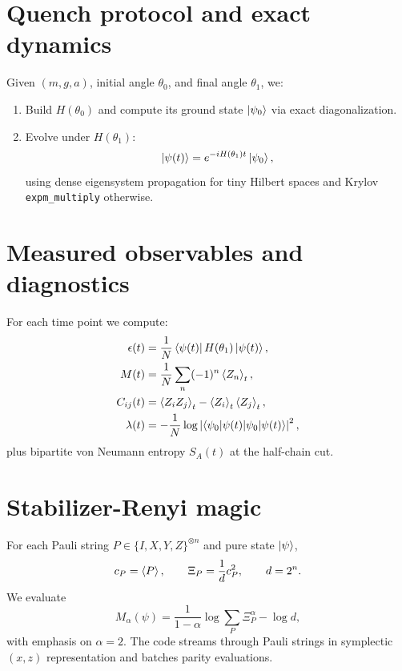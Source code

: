 \documentclass[11pt]{article}
\begin{document}
\section{Quench protocol and exact dynamics}
Given $(m,g,a)$, initial angle $\theta_0$, and final angle $\theta_1$, we:
\begin{enumerate}
    \item Build $H(\theta_0)$ and compute its ground state $\ket{\psi_0}$ via exact diagonalization.
    \item Evolve under $H(\theta_1)$:
    \begin{equation}
    \ket{\psi(t)}=e^{-iH(\theta_1)t}\ket{\psi_0},
    \end{equation}
    using dense eigensystem propagation for tiny Hilbert spaces and Krylov \texttt{expm\_multiply} otherwise.
\end{enumerate}

\section{Measured observables and diagnostics}
For each time point we compute:
\begin{align}
\epsilon(t)&=\frac{1}{N}\bra{\psi(t)}H(\theta_1)\ket{\psi(t)},\\
M(t)&=\frac{1}{N}\sum_n(-1)^n\expval{Z_n}_t,\\
C_{ij}(t)&=\expval{Z_iZ_j}_t-\expval{Z_i}_t\expval{Z_j}_t,\\
\lambda(t)&=-\frac{1}{N}\log\left|\braket{\psi_0|\psi(t)}\right|^2,
\end{align}
plus bipartite von Neumann entropy $S_A(t)$ at the half-chain cut.

\section{Stabilizer-Renyi magic}
For each Pauli string $P\in\{I,X,Y,Z\}^{\otimes n}$ and pure state $\ket{\psi}$,
\begin{equation}
c_P=\expval{P},\qquad \Xi_P=\frac{1}{d}c_P^2,\qquad d=2^n.
\end{equation}
We evaluate
\begin{equation}
M_\alpha(\psi)=\frac{1}{1-\alpha}\log\sum_P\Xi_P^\alpha-\log d,
\end{equation}
with emphasis on $\alpha=2$. The code streams through Pauli strings in symplectic $(x,z)$ representation and batches parity evaluations.
\end{document}

